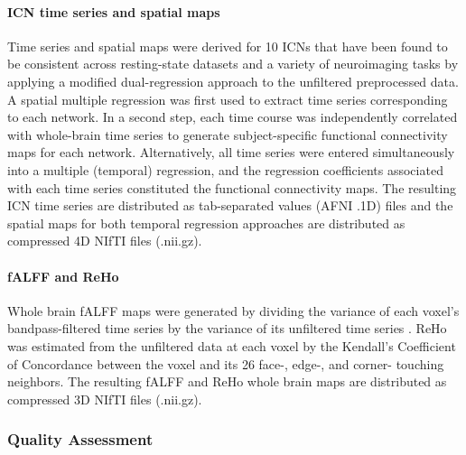 \documentclass[preprint,12pt,3p]{elsarticle}
\begin{document}
\paragraph{ICN time series and spatial maps} Time series and spatial maps were derived for 10 ICNs that have been found to be consistent across resting-state datasets and a variety of neuroimaging tasks \cite{smith2009correspondence} by applying a modified dual-regression approach \cite{Beckmann2009dualreg} to the unfiltered preprocessed data. A spatial multiple regression was first used to extract time series corresponding to each network. In a second step, each time course was independently correlated with whole-brain time series to generate subject-specific functional connectivity maps for each network. Alternatively, all time series were entered simultaneously into a multiple (temporal) regression, and the regression coefficients associated with each time series constituted the functional connectivity maps. The resulting ICN time series are distributed as tab-separated values (AFNI .1D) files and the spatial maps for both temporal regression approaches are distributed as compressed 4D NIfTI files (.nii.gz).

\paragraph{fALFF and ReHo} Whole brain fALFF maps were generated by dividing the variance of each voxel's bandpass-filtered time series by the variance of its unfiltered time series \cite{zuo2008falff}. ReHo was estimated from the unfiltered data at each voxel by the Kendall's Coefficient of Concordance \cite{kendall1939w} between the voxel and its 26 face-, edge-, and corner- touching neighbors. The resulting fALFF and ReHo whole brain maps are distributed as compressed 3D NIfTI files (.nii.gz).

\subsubsection{Quality Assessment} 
\end{document}
